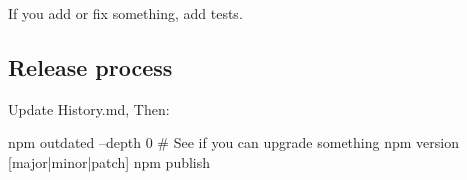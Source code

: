 If you add or fix something, add tests.

\subsection*{Release process}

Update {\ttfamily History.\+md}, Then\+: \begin{DoxyVerb}npm outdated --depth 0 # See if you can upgrade something
npm version [major|minor|patch]
npm publish\end{DoxyVerb}
 